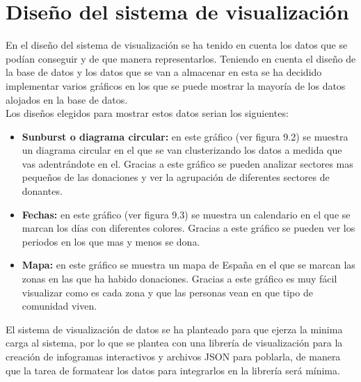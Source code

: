 \section{Diseño del sistema de visualización}
En el diseño del sistema de visualización se ha tenido en cuenta los datos que se podían conseguir y de que manera representarlos. Teniendo en cuenta el diseño de la base de datos y los datos que se van a almacenar en esta se ha decidido implementar varios gráficos en los que se puede mostrar la mayoría de los datos alojados en la base de datos.\\

Los diseños elegidos para mostrar estos datos serian los siguientes:

\begin{itemize}
	\item \textbf{Sunburst o diagrama circular:} en este gráfico (ver figura 9.2) se muestra un diagrama circular en el que se van clusterizando los datos a medida que vas adentrándote en el. Gracias a este gráfico se pueden analizar sectores mas pequeños de las donaciones y ver la agrupación de diferentes sectores de donantes.
	\item \textbf{Fechas:} en este gráfico (ver figura 9.3) se muestra un calendario en el que se marcan los días con diferentes colores. Gracias a este gráfico se pueden ver los periodos en los que mas y menos se dona.
	\item \textbf{Mapa:} en este gráfico se muestra un mapa de España en el que se marcan las zonas en las que ha habido donaciones. Gracias a este gráfico es muy fácil visualizar como es cada zona y que las personas vean en que tipo de comunidad viven.
\end{itemize} 

El sistema de visualización de datos se ha planteado para que ejerza la minima carga al sistema, por lo que se plantea con una librería de visualización para la creación de infogramas interactivos y archivos JSON para poblarla, de manera que la tarea de formatear los datos para integrarlos en la librería será mínima.


